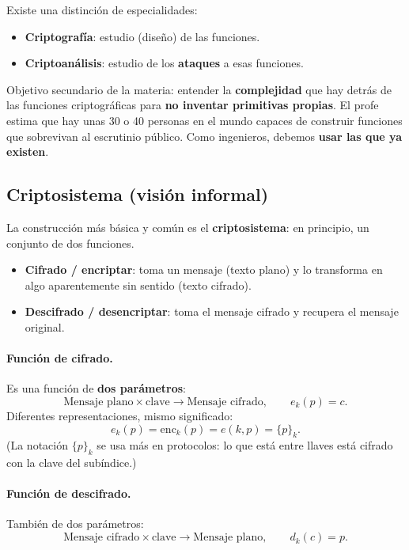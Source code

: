\documentclass[../main.tex]{subfiles}
\begin{document}
\medskip
Existe una distinción de especialidades:
\begin{itemize}[nosep]
  \item \textbf{Criptografía}: estudio (diseño) de las funciones.
  \item \textbf{Criptoanálisis}: estudio de los \textbf{ataques} a esas funciones.
\end{itemize}

\begin{destacado}
Objetivo secundario de la materia: entender la \textbf{complejidad} que hay
detrás de las funciones criptográficas para \textbf{no inventar primitivas
propias}. El profe estima que hay unas 30 o 40 personas en el mundo capaces de
construir funciones que sobrevivan al escrutinio público. Como ingenieros,
debemos \textbf{usar las que ya existen}.
\end{destacado}

\subsection{Criptosistema (visión informal)}

La construcción más básica y común es el \textbf{criptosistema}: en principio,
un conjunto de dos funciones.

\begin{itemize}[nosep]
  \item \textbf{Cifrado / encriptar}: toma un mensaje (texto plano) y lo
        transforma en algo aparentemente sin sentido (texto cifrado).
  \item \textbf{Descifrado / desencriptar}: toma el mensaje cifrado y recupera
        el mensaje original.
\end{itemize}

\paragraph{Función de cifrado.} Es una función de \textbf{dos parámetros}:
$$\text{Mensaje plano} \times \text{clave} \to \text{Mensaje cifrado}, \qquad e_k(p) = c.$$
Diferentes representaciones, mismo significado:
$$e_k(p) = \mathrm{enc}_k(p) = e(k,p) = \{p\}_k.$$
(La notación $\{p\}_k$ se usa más en protocolos: lo que está entre llaves está
cifrado con la clave del subíndice.)

\paragraph{Función de descifrado.} También de dos parámetros:
$$\text{Mensaje cifrado} \times \text{clave} \to \text{Mensaje plano}, \qquad d_k(c) = p.$$
\end{document}
